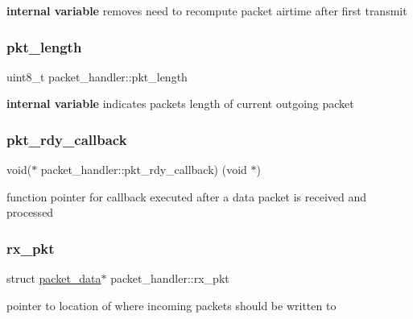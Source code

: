 {\bfseries internal variable} removes need to recompute packet airtime after first transmit \mbox{\label{structpacket__handler_a4292ab96a00dc1506d1cc38fb71fb8d6}} 
\subsubsection{\texorpdfstring{pkt\+\_\+length}{pkt\_length}}
{\footnotesize\ttfamily uint8\+\_\+t packet\+\_\+handler\+::pkt\+\_\+length}

{\bfseries internal variable} indicates packets length of current outgoing packet \mbox{\label{structpacket__handler_aebe312664f54e146c3ebb4dec8371091}} 
\subsubsection{\texorpdfstring{pkt\+\_\+rdy\+\_\+callback}{pkt\_rdy\_callback}}
{\footnotesize\ttfamily void($\ast$  packet\+\_\+handler\+::pkt\+\_\+rdy\+\_\+callback) (void $\ast$)}

function pointer for callback executed after a data packet is received and processed \mbox{\label{structpacket__handler_a96345738c741593283b450e46f843ed5}} 
\subsubsection{\texorpdfstring{rx\+\_\+pkt}{rx\_pkt}}
{\footnotesize\ttfamily struct \mbox{\hyperlink{structpacket__data}{packet\+\_\+data}}$\ast$ packet\+\_\+handler\+::rx\+\_\+pkt}

pointer to location of where incoming packets should be written to \mbox{\label{structpacket__handler_a99f8392fa43c323721b74248145ef4c1}} 
